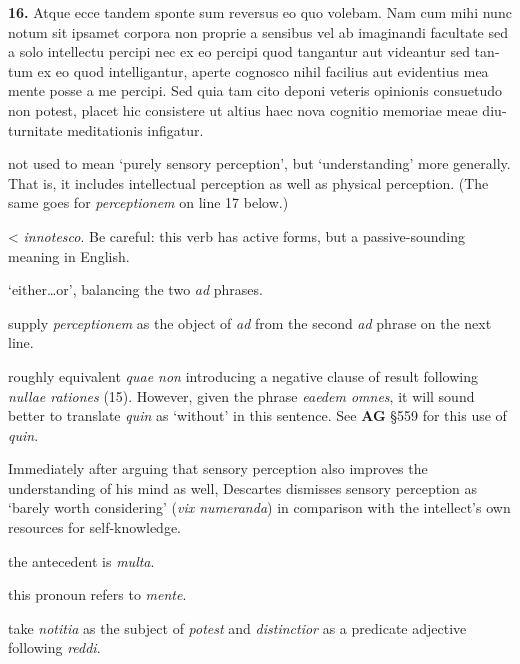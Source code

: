 \beginnumbering
\pstart
\begin{latin}
    \textenglish{\textbf{16.}} Atque ecce tandem sponte sum reversus eo quo volebam. Nam cum mihi nunc notum sit ipsamet corpora non proprie a sensibus vel ab imaginandi facultate sed a solo intellectu percipi nec ex eo percipi quod tangantur aut videantur sed tantum ex eo quod intelligantur, aperte cognosco nihil facilius aut evidentius mea mente posse a me percipi. Sed quia tam cito deponi veteris opinionis consuetudo non potest, placet hic consistere ut altius haec nova cognitio memoriae meae diuturnitate meditationis infigatur.
\end{latin}
\pend
\endnumbering

\prenotes

 not used to mean `purely sensory perception', but `understanding' more generally. That is, it includes intellectual perception as well as physical perception. (The same goes for \textit{perceptionem} on line 17 below.)

 < \textit{innotesco}. Be careful: this verb has active forms, but a passive-sounding meaning in English. 

 `either\dots or', balancing the two \textit{ad} phrases.

 supply \textit{perceptionem} as the object of \textit{ad} from the second \textit{ad} phrase on the next line.

 roughly equivalent \textit{quae non} introducing a negative clause of result following \textit{nullae rationes} (15). However, given the phrase \textit{eaedem omnes}, it will sound better to translate \textit{quin} as `without' in this sentence. See \textbf{AG} §559 for this use of \textit{quin}.

 Immediately after arguing that sensory perception also improves the understanding of his mind as well, Descartes dismisses sensory perception as `barely worth considering' (\textit{vix numeranda}) in comparison with the intellect's own resources for self-knowledge.

 the antecedent is \textit{multa}.

 this pronoun refers to \textit{mente}.

 take \textit{notitia} as the subject of \textit{potest} and \textit{distinctior} as a predicate adjective following \textit{reddi}.

